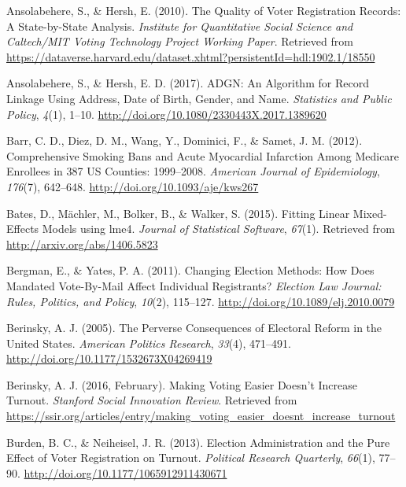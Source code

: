 \documentclass[12pt,twoside]{reedthesis}
\begin{document}
  \hypertarget{ref-ansolabehere_quality_2010}{}
  Ansolabehere, S., \& Hersh, E. (2010). The Quality of Voter Registration
  Records: A State-by-State Analysis. \emph{Institute for Quantitative
  Social Science and Caltech/MIT Voting Technology Project Working Paper}.
  Retrieved from
  \url{https://dataverse.harvard.edu/dataset.xhtml?persistentId=hdl:1902.1/18550}
  
  \hypertarget{ref-ansolabehere_adgn:_2017}{}
  Ansolabehere, S., \& Hersh, E. D. (2017). ADGN: An Algorithm for Record
  Linkage Using Address, Date of Birth, Gender, and Name. \emph{Statistics
  and Public Policy}, \emph{4}(1), 1--10.
  \url{http://doi.org/10.1080/2330443X.2017.1389620}
  
  \hypertarget{ref-barr_comprehensive_2012}{}
  Barr, C. D., Diez, D. M., Wang, Y., Dominici, F., \& Samet, J. M.
  (2012). Comprehensive Smoking Bans and Acute Myocardial Infarction Among
  Medicare Enrollees in 387 US Counties: 1999--2008. \emph{American
  Journal of Epidemiology}, \emph{176}(7), 642--648.
  \url{http://doi.org/10.1093/aje/kws267}
  
  \hypertarget{ref-bates_fitting_2015}{}
  Bates, D., Mächler, M., Bolker, B., \& Walker, S. (2015). Fitting Linear
  Mixed-Effects Models using lme4. \emph{Journal of Statistical Software},
  \emph{67}(1). Retrieved from \url{http://arxiv.org/abs/1406.5823}
  
  \hypertarget{ref-bergman_changing_2011}{}
  Bergman, E., \& Yates, P. A. (2011). Changing Election Methods: How Does
  Mandated Vote-By-Mail Affect Individual Registrants? \emph{Election Law
  Journal: Rules, Politics, and Policy}, \emph{10}(2), 115--127.
  \url{http://doi.org/10.1089/elj.2010.0079}
  
  \hypertarget{ref-berinsky_perverse_2005}{}
  Berinsky, A. J. (2005). The Perverse Consequences of Electoral Reform in
  the United States. \emph{American Politics Research}, \emph{33}(4),
  471--491. \url{http://doi.org/10.1177/1532673X04269419}
  
  \hypertarget{ref-berinsky_making_2016}{}
  Berinsky, A. J. (2016, February). Making Voting Easier Doesn't Increase
  Turnout. \emph{Stanford Social Innovation Review}. Retrieved from
  \url{https://ssir.org/articles/entry/making_voting_easier_doesnt_increase_turnout}
  
  \hypertarget{ref-burden_election_2013}{}
  Burden, B. C., \& Neiheisel, J. R. (2013). Election Administration and
  the Pure Effect of Voter Registration on Turnout. \emph{Political
  Research Quarterly}, \emph{66}(1), 77--90.
  \url{http://doi.org/10.1177/1065912911430671}
  
\end{document}
